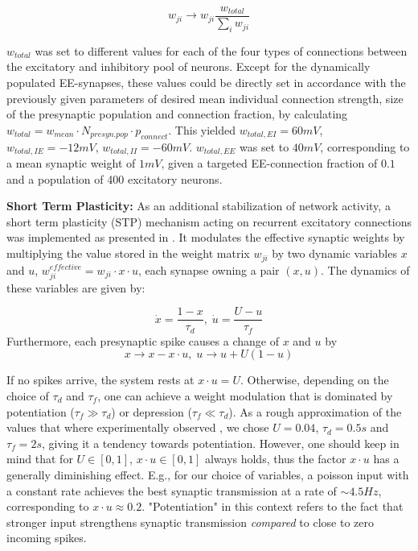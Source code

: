 \documentclass[10pt,a4paper]{article}
\begin{document}
\begin{equation}
w_{ji} \rightarrow w_{ji} \frac{w_{total}}{\sum_i w_{ji}}
\label{Synnnorm}
\end{equation}

$w_{total}$ was set to different values for each of the four types of connections between the excitatory and inhibitory pool of neurons. Except for the dynamically populated EE-synapses, these values could be directly set in accordance with the previously given parameters of desired mean individual connection strength, size of the presynaptic population and connection fraction, by calculating $w_{total} = w_{mean} \cdot N_{presyn. pop}\cdot p_{connect}$. This yielded $w_{total,EI} = 60 mV$, $w_{total,IE} = -12 mV$, $w_{total,II} = -60 mV$. $w_{total,EE}$ was set to $40mV$,  corresponding to a mean synaptic weight of $1mV$, given a targeted EE-connection fraction of $0.1$ and a population of 400 excitatory neurons.

\textbf{Short Term Plasticity:} As an additional stabilization of network activity, a short term plasticity (STP) mechanism acting on recurrent excitatory connections was implemented as presented in \cite{Markram_STP}. It modulates the effective synaptic weights by multiplying the value stored in the weight matrix $w_{ji}$ by two dynamic variables $x$ and $u$, $w^{effective}_{ji} = w_{ji}\cdot x \cdot u$, each synapse owning a pair $(x,u)$. The dynamics of these variables are given by:

\begin{equation}
\dot{x} = \frac{1-x}{\tau_d},\; \dot{u} = \frac{U-u}{\tau_f}
\label{STP_dynamics1}
\end{equation}
Furthermore, each presynaptic spike causes a change of $x$ and $u$ by
\begin{equation}
x \rightarrow x - x\cdot u,\; u \rightarrow u + U(1-u)
\label{STP_dynamics2}
\end{equation}

If no spikes arrive, the system rests at $x\cdot u = U$. Otherwise, depending on the choice of $\tau_d$ and $\tau_f$, one can achieve a weight modulation that is dominated by potentiation ($\tau_f \gg \tau_d$) or depression ($\tau_f \ll \tau_d$). As a rough approximation of the values that where experimentally observed \cite{Markram_STP}, we chose $U=0.04$, $\tau_d = 0.5s$ and $\tau_f = 2s$, giving it a tendency towards potentiation. However, one should keep in mind that for $U\in [0,1]$, $x\cdot u \in [0,1]$ always holds, thus the factor $x\cdot u$ has a generally diminishing effect. E.g., for our choice of variables, a poisson input with a constant rate achieves the best synaptic transmission at a rate of $\sim 4.5 Hz$, corresponding to $x\cdot u \approx 0.2$. "Potentiation" in this context refers to the fact that stronger input strengthens synaptic transmission \emph{compared} to close to zero incoming spikes.
\end{document}
